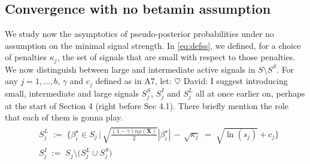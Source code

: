 \documentclass[aos]{imsart}
\theoremstyle{plain}
\newcommand{\david}[1]{{\small{\color{blue} \sf $\heartsuit$ David: #1}}}
\newcommand{\bs}{\boldsymbol}
\begin{document}
\subsection{Convergence with no betamin assumption}\label{ssec:nobetaminhyp}

We study now the asymptotics of pseudo-posterior probabilities under no assumption on the minimal signal strength. In \eqref{eq:defss}, we defined, for a choice of penalties $\kappa_j$, the set of signals that are small with respect to those penalties. We now distinguish between large and intermediate active signals in $S \setminus S^S$. For any $j=1,\ldots,b$, $\gamma$ and $c_j$ defined as in A7, let: 
\david{I suggest introducing small, intermediate and large signals $S_j^S$, $S_j^I$ and $S_j^L$ all at once earlier on, perhaps at the start of Section 4 (right before Sec 4.1). There briefly mention the role that each of them is gonna play.}
\begin{align}\label{eq:defslsi}
 \begin{split}
    &S_j^{L}\;:=\;\Bigg\{\beta_i^{\star} \in S_j \,\Big|\,\sqrt{\frac{(1-\gamma) n\rho(\bs X)}{2}}|\beta_{i}^{\star}| \,- \,\sqrt{\kappa_j} \;=\; \sqrt{\ln(s_j)} + c_{j}\Bigg\}\\
    &S_j^{I}\;:=\;S_j \setminus \big(S_j^L \cup S_j^S\big)
 \end{split}
\end{align}
\end{document}
